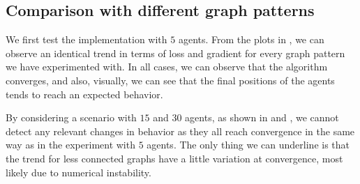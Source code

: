 \documentclass[a4paper,11pt,oneside]{book}
\begin{document}
\subsection{Comparison with different graph patterns}

We first test the implementation with $5$ agents. From the plots in , we can observe an identical trend in terms of loss and gradient for every graph pattern we have experimented with. In all cases, we can observe that the algorithm converges, and also, visually, we can see that the final positions of the agents tends to reach an expected behavior.

By considering a scenario with $15$ and $30$ agents, as shown in  and , we cannot detect any relevant changes in behavior as they all reach convergence in the same way as in the experiment with $5$ agents. The only thing we can underline is that the trend for less connected graphs have a little variation at convergence, most likely due to numerical instability.
\end{document}
